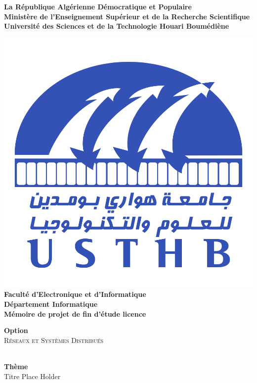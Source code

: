 \begin{titlepage}
\begin{center}

\textbf{
La République Algérienne Démocratique et Populaire\\[0.1cm]
Ministère de l'Enseignement Supérieur et de la Recherche Scientifique\\[0.1cm]
Université des Sciences et de la Technologie Houari Boumédiène\\[0.5cm]}

\includegraphics[scale=0.5]{resources/USTHB_Logo.png}\\[1cm]

{\Large \textbf{
Faculté d’Electronique et d’Informatique\\[0,1cm]
Département Informatique\\[0,1cm]
Mémoire de projet de fin d'étude licence\\[0.5cm]}}

{\Large \textbf{Option\\[0.5cm]}
\textsc{Réseaux et Systèmes Distribués\\}}

\HRule \\[0.4cm]
{\huge 
{\bfseries Thème}\\
Titre Place Holder\\[0.4cm]}
\HRule \\[1.5cm]


\end{center}
\end{titlepage}
